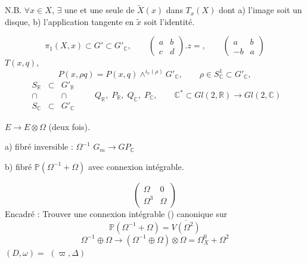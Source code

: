 \documentclass[11pt,a4paper]{article}
\begin{document}

N.B. $\forall x\in X$, $\exists$ une et une seule \ill{}  de $\tilde X(x)$ dans $T_x(X)$ dont a) l'image soit un disque, b) l'application tangente en $\tilde x$ soit l'identité.

\[
\pi_1(X,x) \subset G' \subset G'_{\mathbb{C}}, \qquad
\begin{pmatrix} a & b \\ c & d \end{pmatrix}.z = , \qquad
\begin{pmatrix} a & b \\ -b & a \end{pmatrix}
\]
\struck{$\deg$} $T(x,q)$,
\[
P(x,\rho q) = P(x,q)\wedge^{i_x(\rho)} G'_{\mathbb{C}}, \qquad \rho \in S^1_{\mathbb{C}} \subset G'_{\mathbb{C}},
\]
\[
\begin{array}{ccc}
S_{\mathbb{R}} & \subset & G'_{\mathbb{R}} \\
\cap & & \cap \\
S_{\mathbb{C}} & \subset & G'_{\mathbb{C}}
\end{array}
\qquad Q_{\mathbb{R}},\; P_{\mathbb{R}},\; Q_{\mathbb{C}},\; P_{\mathbb{C}}, \qquad
\mathbb{C}^* \subset Gl(2,\mathbb{R}) \to Gl(2,\mathbb{C})
\]

$E \to E\otimes\Omega$ \;(deux fois).

a) fibré inversible : $\Omega^{-1}$ \qquad $G_m \to GP_{\mathbb{C}}$

b) fibré $\mathbb{P}(\Omega^{-1}+\Omega)$ avec connexion intégrable.

\[
\begin{pmatrix} \Omega & 0 \\ \Omega^3 & \Omega \end{pmatrix}
\]
Encadré : Trouver une connexion intégrable () canonique sur
\[
\mathbb{P}(\Omega^{-1}+\Omega) = \overline{V(\Omega^2)}
\]
\[
\Omega^{-1}\oplus\Omega \longrightarrow (\Omega^{-1}\oplus\Omega)\otimes\Omega = \Omega^0_X + \Omega^2
\]
$(D,\omega) =$ \ill{} $(\varpi,\Delta)$
\end{document}
